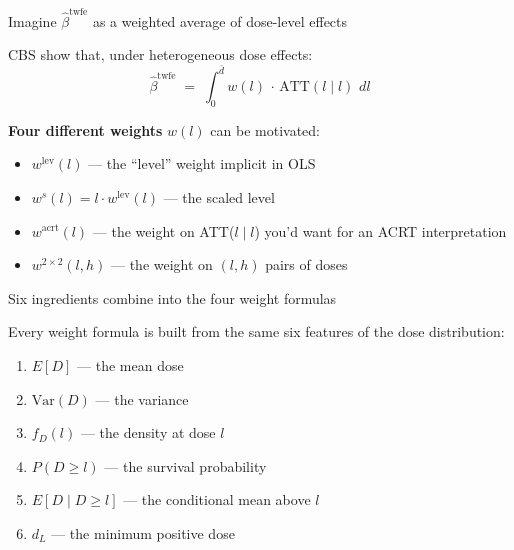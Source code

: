 \documentclass[aspectratio=169,12pt,t]{beamer}
\begin{document}
\begin{frame}{Imagine $\widehat\beta^{\text{twfe}}$ as a weighted average of dose-level effects}
\vspace{0.2cm}

CBS show that, under heterogeneous dose effects:
\[
\widehat\beta^{\text{twfe}} \;=\; \int_0^{\bar d} w(l)\,\cdot\,\text{ATT}(l \mid l)\,\,dl
\]

\vspace{0.4cm}

\textbf{Four different weights} $w(l)$ can be motivated:
\begin{itemize}\small\setlength\itemsep{1pt}
  \item $w^{\text{lev}}(l)$ \;--- the ``level'' weight implicit in OLS
  \item $w^{s}(l) = l \cdot w^{\text{lev}}(l)$ \;--- the scaled level
  \item $w^{\text{acrt}}(l)$ \;--- the weight on ATT($l \mid l$) you'd want for an ACRT interpretation
  \item $w^{2\times 2}(l, h)$ \;--- the weight on $(l, h)$ pairs of doses
\end{itemize}

\vspace{0.3em}
\end{frame}

\begin{frame}{Six ingredients combine into the four weight formulas}
\vspace{0.2cm}

Every weight formula is built from the same six features of the dose distribution:

\vspace{0.4cm}
\begin{enumerate}\small\setlength\itemsep{1pt}
  \item $E[D]$ \;--- the mean dose
  \item $\text{Var}(D)$ \;--- the variance
  \item $f_D(l)$ \;--- the density at dose $l$
  \item $P(D \geq l)$ \;--- the survival probability
  \item $E[D \mid D \geq l]$ \;--- the conditional mean above $l$
  \item $d_L$ \;--- the minimum positive dose
\end{enumerate}

\vspace{0.4cm}
\end{frame}
\end{document}

